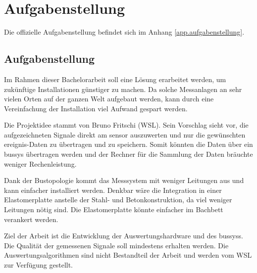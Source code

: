 %
%

\chapter{Aufgabenstellung}\label{chap.aufgabenstellung}

Die offizielle Aufgabenstellung befindet sich im Anhang \ref{app.aufgabenstellung}.

\section{Aufgabenstellung}\label{sec.aufgabenstellung}
Im Rahmen dieser Bachelorarbeit soll eine Lösung erarbeitet werden, um zukünftige Installationen günstiger zu machen. Da solche Messanlagen an sehr vielen Orten auf der ganzen Welt aufgebaut werden, kann durch eine Vereinfachung der Installation viel Aufwand gespart werden. 

Die Projektidee stammt von Bruno Fritschi (WSL). Sein Vorschlag sieht vor, die aufgezeichneten Signale direkt am \gls{sensor} auszuwerten und nur die gewünschten \gls{ereignis}-Daten zu übertragen und zu speichern. Somit könnten die Daten über ein \gls{bussys} übertragen werden und der Rechner für die Sammlung der Daten bräuchte weniger Rechenleistung.

Dank der Bustopologie kommt das Messsystem mit weniger Leitungen aus und kann einfacher installiert werden. Denkbar wäre die Integration in einer Elastomerplatte anstelle der Stahl- und Betonkonstruktion, da viel weniger Leitungen nötig sind. Die Elastomerplatte könnte einfacher im Bachbett verankert werden.

Ziel der Arbeit ist die Entwicklung der Auswertungshardware und des \gls{bussys}s. Die Qualität der gemessenen Signale soll mindestens erhalten werden. Die Auswertungsalgorithmen sind nicht Bestandteil der Arbeit und werden vom WSL zur Verfügung gestellt.


